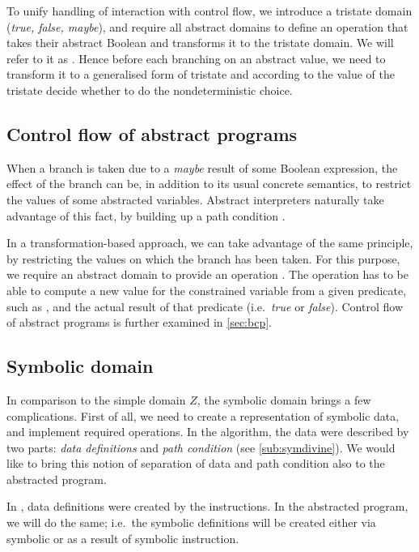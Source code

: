 To unify handling of interaction with control flow, we introduce a tristate
domain (\emph{true, false, maybe}), and require all abstract domains to define
an operation that takes their abstract Boolean and transforms it to the tristate
domain. We will refer to it as . Hence before each
branching on an abstract value, we need to transform it to a generalised form of
tristate and according to the value of the tristate decide whether to do the
nondeterministic choice.

\subsection{Control flow of abstract programs} \label{subsec:cf}
When a branch is taken due to a \emph{maybe} result of some Boolean expression,
the effect of the branch can be, in addition to its usual concrete semantics,
to restrict the values of some abstracted variables. Abstract interpreters
naturally take advantage of this fact, by building up a path condition
\cite{Rockai15}.

In a transformation-based approach, we can take advantage of the same principle, by
restricting the values on which the branch has been taken. For this purpose, we
require an abstract domain to provide an operation . The operation
 has to be able to compute a new value for the constrained
variable from a given \LLVM predicate, such as , and the actual result of
that predicate (i.e.~\emph{true} or \emph{false}). Control flow of abstract
programs is further examined in \autoref{sec:bcp}.

\subsection{Symbolic domain}\label{sec:sym}

In comparison to the simple domain $Z$, the symbolic domain brings a few
complications. First of all, we need to create a representation of symbolic
data, and implement required operations. In the \SymDIVINE algorithm, the data were
described by two parts: \emph{data definitions} and \emph{path condition} (see
\autoref{sub:symdivine}). We would like to bring this notion of separation of
data and path condition also to the abstracted program.

In \SymDIVINE, data definitions were created by the instructions. In the abstracted program, we will do the same; i.e.~the symbolic definitions will be created either via symbolic
 or as a result of symbolic instruction.

